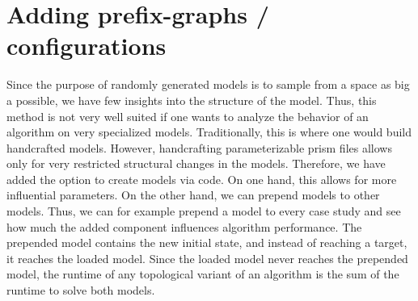 \section{Adding prefix-graphs / configurations}
Since the purpose of randomly generated models is to sample from a space as big a possible, we have few insights into the structure of the model.
Thus, this method is not very well suited if one wants to analyze the behavior of an algorithm on very specialized models. 
Traditionally, this is where one would build handcrafted models. 
However, handcrafting parameterizable prism files allows only for very restricted structural changes in the models. 
Therefore, we have added the option to create models via code. On one hand, this allows for more influential parameters.
On the other hand, we can prepend models to other models. 
Thus, we can for example prepend a model to every case study and see how much the added component influences algorithm performance.
The prepended model contains the new initial state, and instead of reaching a target, it reaches the loaded model.
Since the loaded model never reaches the prepended model, the runtime of any topological variant of an algorithm is the sum of the runtime to solve both models.




